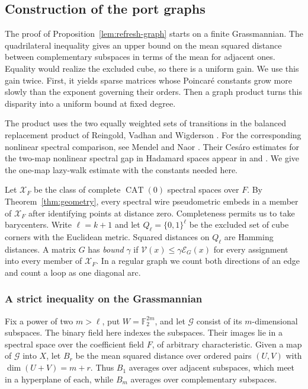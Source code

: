 \subsection{Construction of the port graphs}\label{app:refresh-graph}

The proof of Proposition~\ref{lem:refresh-graph} starts on a finite
Grassmannian. The quadrilateral inequality gives an upper bound on the
mean squared distance between complementary subspaces in terms of the
mean for adjacent ones. Equality would realize the excluded cube, so
there is a uniform gain. We use this gain twice. First, it yields sparse
matrices whose Poincar\'e constants grow more slowly than the exponent
governing their orders. Then a graph product turns this disparity into
a uniform bound at fixed degree.

The product uses the two equally weighted sets of transitions in the
balanced replacement product of Reingold, Vadhan and Wigderson
\cite[Definition~6.6]{RVW}. For the corresponding nonlinear spectral
comparison, see Mendel and Naor \cite[Theorem~1.13(V) and \S8]{MendelNaor}.
Their Ces\'aro estimates for the two-map nonlinear spectral gap in Hadamard
spaces appear in \cite[Corollary~1.9]{MendelNaorBarycentric}
and \cite[Theorem~3.4]{MendelNaorHadamard}. We give the one-map
lazy-walk estimate with the constants needed here.

Let $\mathcal X_F$ be the class of complete $\operatorname{CAT}(0)$
spectral spaces over $F$. By Theorem~\ref{thm:geometry}, every spectral
wire pseudometric embeds in a member of $\mathcal X_F$ after identifying
points at distance zero. Completeness permits us to take barycenters.
Write $\ell=k+1$ and let $Q_\ell=\{0,1\}^\ell$ be the excluded set of
cube corners with the Euclidean metric. Squared distances on $Q_\ell$
are Hamming distances. A matrix
$G$ has \emph{bound} $\gamma$ if $\mathcal V(x)\le\gamma\mathcal E_G(x)$
for every assignment into every member of $\mathcal X_F$. In a regular
graph we count both directions of an edge and count a loop as one diagonal
arc.

\subsubsection{A strict inequality on the Grassmannian}
Fix a power of two $m>\ell$, put
$W=\mathbb F_2^{2m}$, and let $\mathcal G$ consist of its $m$-dimensional
subspaces. The binary field here indexes the subspaces. Their images
lie in a spectral space over the coefficient field $F$, of arbitrary
characteristic. Given a map of $\mathcal G$ into $X$, let $B_r$ be the mean
squared distance over ordered pairs $(U,V)$ with $\dim(U+V)=m+r$.
Thus $B_1$ averages over adjacent subspaces, which meet in a hyperplane
of each, while $B_m$ averages over complementary subspaces.

